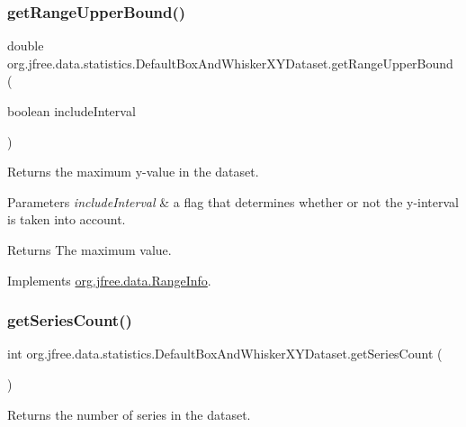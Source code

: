 \subsubsection{\texorpdfstring{get\+Range\+Upper\+Bound()}{getRangeUpperBound()}}
{\footnotesize\ttfamily double org.\+jfree.\+data.\+statistics.\+Default\+Box\+And\+Whisker\+X\+Y\+Dataset.\+get\+Range\+Upper\+Bound (\begin{DoxyParamCaption}\item[{boolean}]{include\+Interval }\end{DoxyParamCaption})}

Returns the maximum y-\/value in the dataset.


\begin{DoxyParams}{Parameters}
{\em include\+Interval} & a flag that determines whether or not the y-\/interval is taken into account.\\
\hline
\end{DoxyParams}
\begin{DoxyReturn}{Returns}
The maximum value. 
\end{DoxyReturn}


Implements \mbox{\hyperlink{interfaceorg_1_1jfree_1_1data_1_1_range_info_a85987bb398c50351d190b2b888ff3348}{org.\+jfree.\+data.\+Range\+Info}}.

\mbox{\label{classorg_1_1jfree_1_1data_1_1statistics_1_1_default_box_and_whisker_x_y_dataset_acfef7ad3244f539fec7239f4b9b5a397}} 
\subsubsection{\texorpdfstring{get\+Series\+Count()}{getSeriesCount()}}
{\footnotesize\ttfamily int org.\+jfree.\+data.\+statistics.\+Default\+Box\+And\+Whisker\+X\+Y\+Dataset.\+get\+Series\+Count (\begin{DoxyParamCaption}{ }\end{DoxyParamCaption})}

Returns the number of series in the dataset. 

